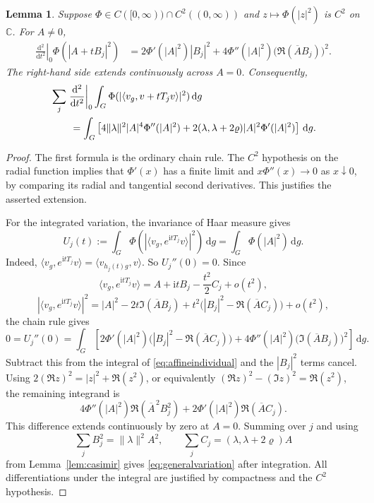 \documentclass[11pt,reqno]{amsart}
\numberwithin{equation}{section}
\theoremstyle{plain}
\newtheorem{lemma}[theorem]{Lemma}
\theoremstyle{remark}
\newcommand{\C}{\mathbb C}
\newcommand{\rh}{\varrho}
\newcommand{\ii}{\mathrm i}
\newcommand{\dd}{\,\mathrm d}
\newcommand{\norm}[1]{\lVert#1\rVert}
\newcommand{\ip}[2]{\langle#1,#2\rangle}
\begin{document}
\begin{lemma}\label{lem:scalarvariation}
Suppose $\Phi\in C([0,\infty))\cap C^2((0,\infty))$ and
$z\mapsto\Phi(|z|^2)$ is $C^2$ on $\C$. For $A\ne0$,
\begin{align}\label{eq:affineindividual}
 \left.\frac{\mathrm d^2}{\mathrm dt^2}\right|_0\Phi(|A+tB_j|^2)
 &=2\Phi'(|A|^2)|B_j|^2
   +4\Phi''(|A|^2)\bigl(\Re(\overline A B_j)\bigr)^2.
\end{align}
The right-hand side extends continuously across $A=0$. Consequently,
\begin{align}\label{eq:generalvariation}
 &\sum_j\left.\frac{\mathrm d^2}{\mathrm dt^2}\right|_0
 \int_G\Phi(|\ip{v_g}{v+tT_jv}|^2)\dd g\notag\\
 &\qquad=\int_G\left[4\norm{\lambda}^2|A|^4\Phi''(|A|^2)
 +2(\lambda,\lambda+2\rh)|A|^2\Phi'(|A|^2)\right]\dd g.
\end{align}
\end{lemma}
\begin{proof}
The first formula is the ordinary chain rule.
The $C^2$ hypothesis on the radial function implies that
$\Phi'(x)$ has a finite limit and $x\Phi''(x)\to0$ as $x\downarrow0$,
by comparing its radial and tangential second derivatives.
This justifies the asserted extension.

For the integrated variation, the invariance of Haar measure gives
\[
 U_j(t):=\int_G\Phi(|\ip{v_g}{e^{\ii tT_j}v}|^2)\dd g
        =\int_G\Phi(|A|^2)\dd g.
\]
Indeed, $\ip{v_g}{e^{\ii tT_j}v}=\ip{v_{h_j(t)g}}v$. So $U_j''(0)=0$.
Since
\[
 \ip{v_g}{e^{\ii tT_j}v}
 =A+\ii tB_j-\frac{t^2}{2}C_j+o(t^2),
\]
\[
 |\ip{v_g}{e^{\ii tT_j}v}|^2
 =|A|^2-2t\Im(\overline A B_j)
 +t^2\bigl(|B_j|^2-\Re(\overline A C_j)\bigr)+o(t^2),
\]
the chain rule gives
\[
 0=U_j''(0)=\int_G\left[
 2\Phi'(|A|^2)\bigl(|B_j|^2-\Re(\overline A C_j)\bigr)
 +4\Phi''(|A|^2)\bigl(\Im(\overline A B_j)\bigr)^2\right]\dd g.
\]
Subtract this from the integral of \eqref{eq:affineindividual} and
the $|B_j|^2$ terms cancel. Using
$2(\Re z)^2=|z|^2+\Re(z^2)$, or equivalently
$(\Re z)^2-(\Im z)^2=\Re(z^2)$, the remaining integrand is
\[
 4\Phi''(|A|^2)\Re(\overline A^{\,2}B_j^2)
 +2\Phi'(|A|^2)\Re(\overline A C_j).
\]
This difference extends continuously by zero at $A=0$.
Summing over $j$ and using
\[
 \sum_jB_j^2=\norm{\lambda}^2 A^2,\qquad
 \sum_jC_j=(\lambda,\lambda+2\rh)A
\]
from Lemma~\ref{lem:casimir} gives \eqref{eq:generalvariation} after integration.
All differentiations under the integral are justified by compactness
and the $C^2$ hypothesis.
\end{proof}
\end{document}

